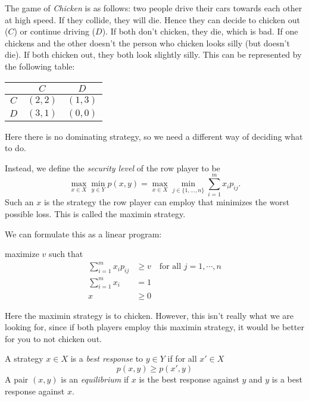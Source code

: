 \documentclass[a4paper]{article}
\begin{document}
\begin{eg}[Chicken]
  The game of \emph{Chicken} is as follows: two people drive their cars towards each other at high speed. If they collide, they will die. Hence they can decide to chicken out ($C$) or continue driving ($D$). If both don't chicken, they die, which is bad. If one chickens and the other doesn't the person who chicken looks silly (but doesn't die). If both chicken out, they both look slightly silly. This can be represented by the following table:
  \begin{center}
    \begin{tabular}{ccc}
      \toprule
      & $C$ & $D$ \\
      \midrule
      $C$ & $(2, 2)$ & $(1, 3)$ \\
      $D$ & $(3, 1)$ & $(0, 0)$\\
      \bottomrule
    \end{tabular}
  \end{center}
  Here there is no dominating strategy, so we need a different way of deciding what to do.

  Instead, we define the \emph{security level} of the row player to be
  \[
    \max_{x\in X}\min_{y\in Y} p(x, y) = \max_{x\in X}\min_{j\in \{1, \ldots, n\}} \sum_{i = 1}^m x_i p_{ij}.
  \]
  Such an $x$ is the strategy the row player can employ that minimizes the worst possible loss. This is called the maximin strategy.

  We can formulate this as a linear program:
  \begin{center}
    maximize $v$ such that
    \begin{align*}
      \sum_{i = 1}^m x_i p_{ij} &\geq v\quad\text{for all }j = 1, \cdots, n\\
      \sum_{i = 1}^m x_i &= 1\\
      x &\geq 0
    \end{align*}
  \end{center}
  Here the maximin strategy is to chicken. However, this isn't really what we are looking for, since if both players employ this maximin strategy, it would be better for you to not chicken out.
\end{eg}

\begin{defi}
  A strategy $x\in X$ is a \emph{best response} to $y\in Y$ if for all $x'\in X$
  \[
    p(x, y) \geq p(x', y)
  \]
  A pair $(x, y)$ is an \emph{equilibrium} if $x$ is the best response against $y$ and $y$ is a best response against $x$.
\end{defi}
\end{document}
